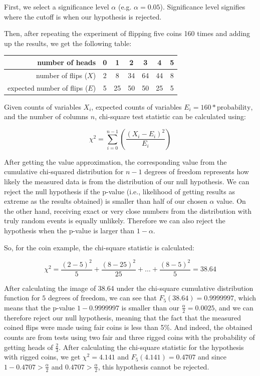 \documentclass[
  digital, %
  color,   %
  oneside, %
  lof,     %
  nolot,     %
]{fithesis4}
\begin{document}
First, we select a significance level $\alpha$ (e.g. $\alpha = 0.05$).
Significance level signifies where the cutoff is when our hypothesis is rejected.

Then, after repeating the experiment of flipping five coins 160 times and adding up the results, we get the following table: 
\begin{center}
    \begin{tabular}{r | c c c c c c}
         number of heads & 0 & 1 & 2 & 3 & 4 & 5 \\ \hline
         number of flips ($X$) & 2 & 8 & 34 & 64 & 44 & 8 \\
         expected number of flips ($E$) & 5 & 25 & 50 & 50 & 25 & 5
    \end{tabular}
\end{center}

Given counts of variables $X_i$, expected counts of variables $E_i = 160 * \text{probability}$, and the number of columns $n$, chi-square test statistic can be calculated using: 

\begin{equation}
  \chi^2 = \sum^{n - 1}_{i = 0}{\left(\frac{(X_i - E_i)^2}{E_i}\right)}
  \label{eq:chi2-statistic}
\end{equation}

After getting the value approximation, the corresponding value from the cumulative chi-squared distribution for $n - 1$ degrees of freedom represents how likely the measured data is from the distribution of our null hypothesis.
We can reject the null hypothesis if the p-value (i.e., likelihood of getting results as extreme as the results obtained) is smaller than half of our chosen $\alpha$ value.
On the other hand, receiving exact or very close numbers from the distribution with truly random events is equally unlikely.
Therefore we can also reject the hypothesis when the p-value is larger than $1 - \alpha$.\cite{knuth81}

So, for the coin example, the chi-square statistic is calculated:

\begin{equation}
  \chi^2 = \frac{(2 - 5)^2}{5} + \frac{(8 - 25)^2}{25} + \dots + \frac{(8 - 5)^2}{5} = 38.64
  \label{eq:chi2-statistic-example}
\end{equation}

After calculating the image of 38.64 under the chi-square cumulative distribution function for $5$ degrees of freedom, we can see that $F_5(38.64) = 0.9999997$, which means that the p-value $1 - 0.9999997$ is smaller than our $\frac{\alpha}{2} = 0.0025$, and we can therefore reject our null hypothesis, meaning that the fact that the measured coined flips were made using fair coins is less than 5\%.
And indeed, the obtained counts are from tests using two fair and three rigged coins with the probability of getting heads of $\frac{2}{3}$.
After calculating the chi-square statistic for the hypothesis with rigged coins, we get $\chi^2 = 4.141$ and $F_5(4.141) = 0.4707$ and since $1 - 0.4707 > \frac{\alpha}{2}$ and $0.4707 > \frac{\alpha}{2}$, this hypothesis cannot be rejected.
\end{document}
